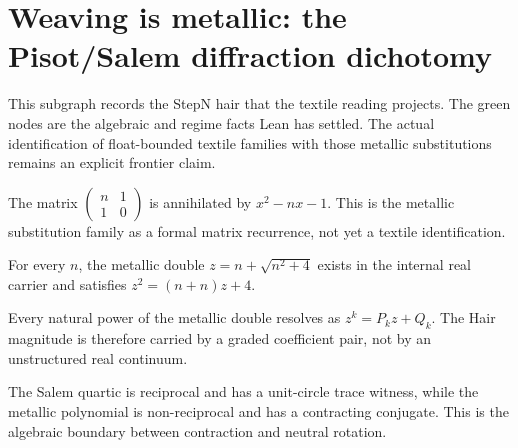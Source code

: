 \section{Weaving is metallic: the Pisot/Salem diffraction dichotomy}

This subgraph records the StepN hair that the textile reading projects.  The
green nodes are the algebraic and regime facts Lean has settled.  The actual
identification of float-bounded textile families with those metallic
substitutions remains an explicit frontier claim.

\begin{theorem}\label{thm:metallic-family-cayley-hamilton}\leanok{}
The matrix \(\begin{pmatrix}n&1\\1&0\end{pmatrix}\) is annihilated by
\(x^2-nx-1\).  This is the metallic substitution family as a formal
matrix recurrence, not yet a textile identification.
\end{theorem}

\begin{theorem}\label{thm:metallic-mean-real}\leanok{}
For every \(n\), the metallic double \(z=n+\sqrt{n^2+4}\) exists in the
internal real carrier and satisfies \(z^2=(n+n)z+4\).
\end{theorem}

\begin{theorem}\label{thm:metallic-power-lens}\leanok{}
Every natural power of the metallic double resolves as \(z^k=P_kz+Q_k\).
The Hair magnitude is therefore carried by a graded coefficient pair,
not by an unstructured real continuum.
\end{theorem}

\begin{theorem}\label{thm:salem-pisot-algebraic-split}\leanok{}
The Salem quartic is reciprocal and has a unit-circle trace witness, while
the metallic polynomial is non-reciprocal and has a contracting conjugate.
This is the algebraic boundary between contraction and neutral rotation.
\end{theorem}

